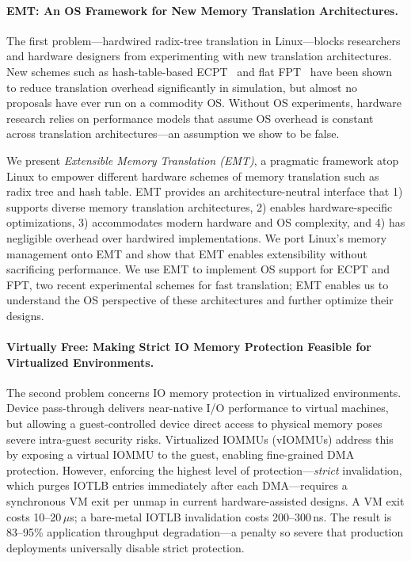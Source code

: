 \paragraph{EMT: An OS Framework for New Memory Translation Architectures.}
The first problem---hardwired radix-tree translation in Linux---blocks
researchers and hardware designers from experimenting with new translation
architectures.
New schemes such as hash-table-based ECPT~\cite{skarlatos2020ecpt} and
flat FPT~\cite{park2022fpt} have been shown to reduce translation overhead
significantly in simulation, but almost no proposals have ever run on a commodity OS.
Without OS experiments, hardware research relies on performance models that
assume OS overhead is constant across translation architectures---an assumption
we show to be false.

We present \emph{Extensible Memory Translation (EMT)}, a pragmatic framework
atop Linux to empower different hardware schemes of memory translation
such as radix tree and hash table.
EMT provides an architecture-neutral interface that
1) supports diverse memory translation architectures,
2) enables hardware-specific optimizations,
3) accommodates modern hardware and OS complexity,
and 4) has negligible overhead over hardwired implementations.
We port Linux's memory management onto EMT and show that
EMT enables extensibility without sacrificing performance.
We use EMT to implement OS support for ECPT and FPT, two recent experimental
schemes for fast translation;
EMT enables us to understand the OS perspective of these architectures
and further optimize their designs.

\paragraph{Virtually Free: Making Strict IO Memory Protection Feasible for Virtualized Environments.}
The second problem concerns IO memory protection in virtualized environments.
Device pass-through delivers near-native I/O performance to virtual machines,
but allowing a guest-controlled device direct access to physical memory poses
severe intra-guest security risks.
Virtualized IOMMUs (vIOMMUs) address this by exposing a virtual IOMMU to the
guest, enabling fine-grained DMA protection.
However, enforcing the highest level of protection---\emph{strict} invalidation,
which purges IOTLB entries immediately after each DMA---requires
a synchronous VM exit per unmap in current hardware-assisted designs.
A VM exit costs 10--20\,$\mu$s; a bare-metal IOTLB invalidation costs 200--300\,ns.
The result is 83--95\% application throughput degradation---a penalty so severe
that production deployments universally disable strict protection.

